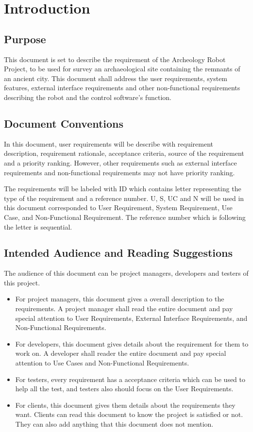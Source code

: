 \documentclass[11pt, a4paper]{report}
\begin{document}
\chapter{Introduction}

\section{Purpose}
This document is set to describe the requirement of the Archeology Robot Project, to be used for survey an archaeological site containing the remnants of an ancient city. This document shall address the user requirements, system features, external interface requirements and other non-functional requirements describing the robot and the control software's function. 


\section{Document Conventions}
In this document, user requirements will be describe with requirement description, requirement rationale, acceptance criteria, source of the requirement and a priority ranking. However, other requirements such as external interface requirements and non-functional requirements may not have priority ranking. 

The requirements will be labeled with ID which contains letter representing the type of the requirement and a reference number. U, S, UC and N will be used in this document corresponded to User Requirement, System Requirement, Use Case, and Non-Functional Requirement.  The reference number which is following the letter is sequential.



\section{Intended Audience and Reading Suggestions}
The audience of this document can be project managers, developers and testers of this project. 
\begin{itemize}
\item For project managers, this document gives a overall description to the requirements. A project manager shall read the entire document and pay special attention to User Requirements, External Interface Requirements, and Non-Functional Requirements.
\item For developers, this document gives details about the requirement for them to work on. A developer shall reader the entire document and pay special attention to Use Cases and Non-Functional Requirements. 
\item For testers, every requirement has a acceptance criteria which can be used to help all the test, and testers also should focus on the User Requirements. 
\item For clients, this document gives them details about the requirements they want. Clients can read this document to know the project is satisfied or not. They can also add anything that this document does not mention. 
\end{itemize}
\end{document}
